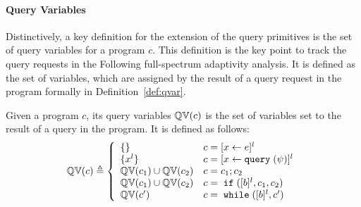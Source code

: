 \paragraph{Query Variables}
Distinctively, a key definition for the extension of the query primitives 
is the set of query variables for a program $c$.
This definition is the key point to track the query requests in the Following full-spectrum adaptivity analysis.
It is defined as the set of variables,
which are assigned by the result of a query request in the program formally in Definition~\ref{def:qvar}.
%
\begin{defn} 
  \label{def:qvar}
Given a program $c$, its query variables 
$\mathbb{QV}(c)$ is the set of variables set to the result of a query in the program.
It is defined as follows:
{
$$
  \qvar(c) \triangleq
  \left\{
  \begin{array}{ll}
      \{\}                  
      & {c} = [{\assign x \expr}]^{l} 
      \\
      \{{x}^l\}                  
      & {c} = [{\assign x \query(\qexpr)}]^{l} 
      \\
      \qvar(c_1) \cup \qvar(c_2)  
      & {c} = {c_1};{c_2}
      \\
      \qvar(c_1) \cup \qvar(c_2) 
      & {c} =\eif([\bexpr]^{l}, c_1, c_2) 
      \\
      \qvar(c')
      & {c}   = \ewhile ([\bexpr]^{l}, {c}')
\end{array}
\right.
$$
}
\end{defn}
